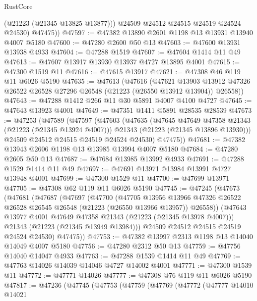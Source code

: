 \begin{lexlean}{RustCore}
\begin{coremodule}
            (@21223 (@21345 @13825 @13877)))
          @24509
          @24512
          @24515
          @24519
          @24524
          @24530)
        @47475))
@47597 := @47382 @13890 @2601 @1198 @13 @13931 @13940 @4007 @5180
@47600 := @47280 @2600 @50 @13
@47603 := @47600 @13931 @13938 @4933
@47604 := @47288 @1519
@47607 := @47604 @1414 @11 @49
@47613 := @47607 @13917 @13930 @13937 @4727 @13895 @4001
@47615 := @47300 @1519 @11
@47616 := @47615 @13917
@47621 := @47308 @46 @119 @11 @6026 @5190
@47635 := @47613
    (@47616
      (@47621
        @13903
        @13912
        @47326
        @26522
        @26528
        @27296
        @26548
        (@21223 (@26550 @13912 @13904))
        @26558))
@47643 := @47288 @1412 @266 @11 @30 @5891 @4007 @4100 @4727
@47645 := @47643 @13923 @4001
@47649 := @47351 @1411 @5891 @28535 @28539
@47673 := @47253
    (@47589
      (@47597
        (@47603
          (@47635
            (@47645 @47649 @47358 @21343 (@21223 (@21345 @13924 @4007)))
            @21343
            (@21223 (@21345 @13896 @13930)))
          @24509
          @24512
          @24515
          @24519
          @24524
          @24530)
        @47475))
@47681 := @47382 @13943 @2606 @1198 @13 @13985 @13994 @4007 @5180
@47684 := @47280 @2605 @50 @13
@47687 := @47684 @13985 @13992 @4933
@47691 := @47288 @1529 @1414 @11 @49
@47697 := @47691 @13971 @13984 @13991 @4727 @13948 @4001
@47699 := @47300 @1529 @11
@47700 := @47699 @13971
@47705 := @47308 @62 @119 @11 @6026 @5190
@47745 := @47245
    (@47673
      (@47681
        (@47687
          (@47697
            (@47700
              (@47705
                @13956
                @13966
                @47326
                @26522
                @26528
                @26545
                @26548
                (@21223 (@26550 @13966 @13957))
                @26558))
            (@47643 @13977 @4001 @47649 @47358 @21343 (@21223 (@21345 @13978 @4007)))
            @21343
            (@21223 (@21345 @13949 @13984)))
          @24509
          @24512
          @24515
          @24519
          @24524
          @24530)
        @47475))
@47753 := @47382 @13997 @2313 @1198 @13 @14040 @14049 @4007 @5180
@47756 := @47280 @2312 @50 @13
@47759 := @47756 @14040 @14047 @4933
@47763 := @47288 @1539 @1414 @11 @49
@47769 := @47763 @14026 @14039 @14046 @4727 @14002 @4001
@47771 := @47300 @1539 @11
@47772 := @47771 @14026
@47777 := @47308 @76 @119 @11 @6026 @5190
@47817 := @47236
    (@47745
      (@47753
        (@47759
          (@47769
            (@47772
              (@47777
                @14010
                @14021

\end{coremodule}
\end{lexlean}
